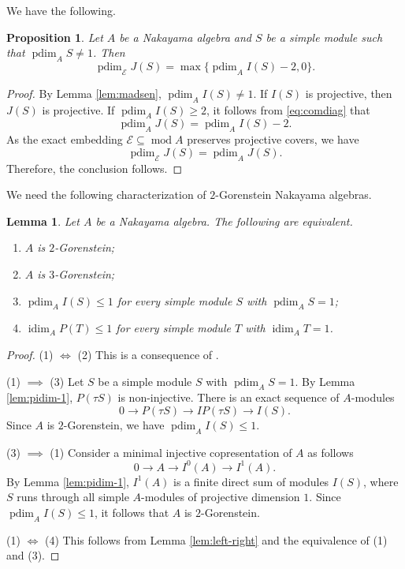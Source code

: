 \documentclass[a4paper,reqno]{amsart}
\numberwithin{equation}{section}
\theoremstyle{plain}
\newtheorem{prop}[thm]{Proposition}
\newtheorem{lem}[thm]{Lemma}
\theoremstyle{definition}
\theoremstyle{remark}
\renewcommand{\mod}{\operatorname{mod}}
\DeclareMathOperator{\pdim}{pdim}
\DeclareMathOperator{\idim}{idim}
\renewcommand{\-}{\mbox{-}}
\newcommand{\scE}{\mathcal{E}}
\begin{document}
We have the following.

\begin{prop}\label{prop:injdim}
Let \(A\) be a Nakayama algebra and \(S\) be a  simple module 
such that \(\pdim_AS\neq 1\). 
Then
\begin{equation*}
    \pdim_{\scE}J(S)=\max\{\pdim_AI(S)-2,0\}.
\end{equation*}
\end{prop}

\begin{proof}
By Lemma \ref{lem:madsen},  \(\pdim_AI(S)\neq 1\).
If \(I(S)\) is projective, then  
\(J(S)\) is  projective.
If \(\pdim_AI(S)\ge 2\),  it follows from \eqref{eq:comdiag} that 
\[\pdim_{A}J(S)=\pdim_AI(S)-2.\]
As the exact embedding \(\scE\subseteq \mod A\)  preserves projective covers, 
we have
\[\pdim_\scE J(S)=\pdim_AJ(S).\] 
Therefore, the conclusion follows.
\end{proof}

We need the following characterization of \(2\)-Gorenstein Nakayama algebras.


\begin{lem} \label{lem:2-gor}
Let \(A\) be a Nakayama algebra. The following are equivalent.
\begin{enumerate}
    \item \(A\) is \(2\)-Gorenstein;
    \item \(A\) is \(3\)-Gorenstein;
    \item \(\pdim_AI(S)\le 1\) for every simple module \(S\) with \(\pdim_AS=1\);
    \item \(\idim_AP(T)\le 1\) for every simple module \(T\) with \(\idim_AT=1\).
\end{enumerate}
\end{lem}


\begin{proof}
    (1) \(\iff\) (2)
    This is a consequence of \cite[2.10]{FI93}.

    (1) \(\implies\) (3)
    Let \(S\) be a simple module \(S\) with \(\pdim_AS=1\).
    By Lemma \ref{lem:pidim-1}, 
    \(P(\tau S)\) is  non-injective.
    There is an exact sequence of \(A\)-modules
    \begin{equation*}
        0\to P(\tau S)\to IP(\tau S) \to I(S).
    \end{equation*}
    Since \(A\) is \(2\)-Gorenstein, we have \(\pdim_AI(S)\le 1\).

    (3) \(\implies\) (1)
    Consider a minimal injective copresentation of \(A\) as follows
    \begin{equation*}
        0\to A\to I^0(A)\to I^1(A).
    \end{equation*}
    By Lemma \ref{lem:pidim-1},
    \(I^1(A)\) is a finite direct sum of modules \(I(S)\), 
    where \(S\) runs through all  simple \(A\)-modules of projective dimension \(1\).
    Since \(\pdim_AI(S)\le 1\), 
    it follows that \(A\) is \(2\)-Gorenstein.


    (1) \(\iff\) (4) 
    This follows from Lemma \ref{lem:left-right} and the equivalence of (1) and (3).
\end{proof}
\end{document}
